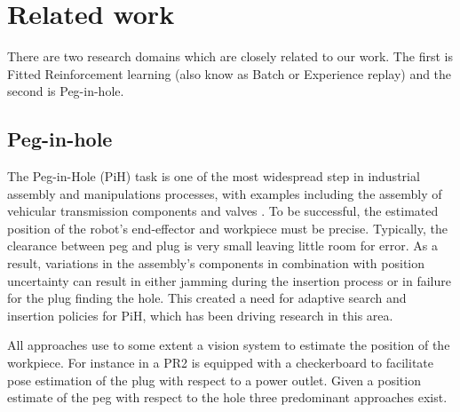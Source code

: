 \documentclass[final,3p,times,twocolumn]{elsarticle}
\begin{document}
\section{Related work}\label{sec:related_work}

There are two research domains which are closely related to our work. The first 
is Fitted Reinforcement learning (also know as Batch or Experience replay) and the 
second is Peg-in-hole.



\subsection{Peg-in-hole}
%
%

The Peg-in-Hole (PiH) task is one of the most widespread step in industrial assembly and manipulations processes, 
with examples including the assembly of vehicular transmission components \cite{search_strategies_icra_2001} and 
valves \cite{online_gpr_icra_2014}. To be successful, the estimated position of the robot's end-effector 
and workpiece must be precise. Typically, the clearance between peg and plug is very small leaving little 
room for error. As a result, variations in the assembly's components in combination with position 
uncertainty can result in either jamming during the insertion process or in failure for the plug finding 
the hole. This created a need for adaptive search and insertion policies for PiH, which has been 
driving research in this area. 

All approaches use to some extent a vision system to estimate the position of the workpiece. 
For instance in \cite{peg_personal_icra_2010} a PR2 is equipped with a checkerboard to facilitate pose
estimation  of the plug with respect to a power outlet. Given a position estimate of the peg with 
respect to the hole three predominant approaches exist.
\end{document}
